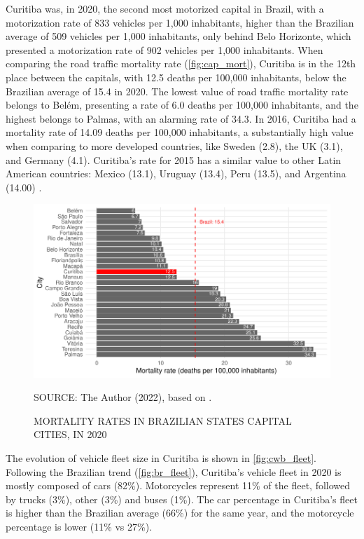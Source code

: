 Curitiba was, in 2020, the second most motorized capital in Brazil, with a motorization rate of 833 vehicles per 1,000 inhabitants, higher than the Brazilian average of 509 vehicles per 1,000 inhabitants, only behind Belo Horizonte, which presented a motorization rate of 902 vehicles per 1,000 inhabitants. When comparing the road traffic mortality rate (\autoref{fig:cap_mort}), Curitiba is in the 12th place between the capitals, with 12.5 deaths per 100,000 inhabitants, below the Brazilian average of 15.4 in 2020. The lowest value of road traffic mortality rate belongs to Belém, presenting a rate of 6.0 deaths per 100,000 inhabitants, and the highest belongs to Palmas, with an alarming rate of 34.3. In 2016, Curitiba had a mortality rate of 14.09 deaths per 100,000 inhabitants, a substantially high value when comparing to more developed countries, like Sweden (2.8), the UK (3.1), and Germany (4.1). Curitiba's rate for 2015 has a similar value to other Latin American countries: Mexico (13.1), Uruguay (13.4), Peru (13.5), and Argentina (14.00) \cite{WHO2018}. 

\begin{figure}[!htbp]
    \centering\footnotesize
    \captionsetup{font=footnotesize}
    \caption{MORTALITY RATES IN BRAZILIAN STATES CAPITAL CITIES, IN 2020}
    \includegraphics{fig/cap_mort.pdf}
    \label{fig:cap_mort}
    \par SOURCE: The Author (2022), based on \textcite{MinistryofHealth2022,MinistryofHealth2021}.
\end{figure}  

The evolution of vehicle fleet size in Curitiba is shown in \autoref{fig:cwb_fleet}. Following the Brazilian trend (\autoref{fig:br_fleet}), Curitiba's vehicle fleet in 2020 is mostly composed of cars (82\%). Motorcycles represent 11\% of the fleet, followed by trucks (3\%), other (3\%) and buses (1\%). The car percentage in Curitiba's fleet is higher than the Brazilian average (66\%) for the same year, and the motorcycle percentage is lower (11\% vs 27\%).

